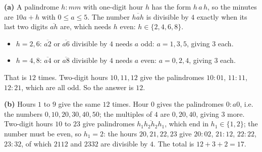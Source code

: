 \textbf{(a)} A palindrome $h{:}mm$ with one-digit hour $h$ has the form $h\,a\,h$, so the minutes are $10a+h$ with $0\le a\le5$. The number $\overline{hah}$ is divisible by $4$ exactly when its last two digits $\overline{ah}$ are, which needs $h$ even: $h\in\{2,4,6,8\}$.
\begin{itemize}
\item $h=2,6$: $\overline{a2}$ or $\overline{a6}$ divisible by $4$ needs $a$ odd: $a=1,3,5$, giving $3$ each.
\item $h=4,8$: $\overline{a4}$ or $\overline{a8}$ divisible by $4$ needs $a$ even: $a=0,2,4$, giving $3$ each.
\end{itemize}
That is $12$ times. Two-digit hours $10,11,12$ give the palindromes $10{:}01$, $11{:}11$, $12{:}21$, which are all odd. So the answer is $\boxed{12}$.

\textbf{(b)} Hours $1$ to $9$ give the same $12$ times. Hour $0$ gives the palindromes $0{:}a0$, i.e. the numbers $0,10,20,30,40,50$; the multiples of $4$ are $0,20,40$, giving $3$ more. Two-digit hours $10$ to $23$ give palindromes $\overline{h_1h_2h_2h_1}$, which end in $h_1\in\{1,2\}$; the number must be even, so $h_1=2$: the hours $20,21,22,23$ give $20{:}02$, $21{:}12$, $22{:}22$, $23{:}32$, of which $2112$ and $2332$ are divisible by $4$. The total is $12+3+2=\boxed{17}$.
